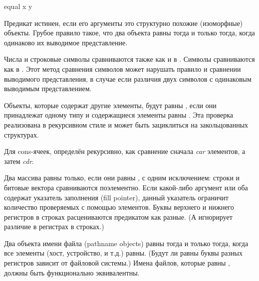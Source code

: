 \begin{defun}[Функция]
equal x y

Предикат  истинен, если его аргументы это структурно похожие
(изоморфные) объекты. Грубое правило такое, что два объекта равны 
тогда и только тогда, когда одинаково их выводимое представление.

Числа и строковые символы сравниваются также как и в .
Символы сравниваются как в . Этот метод сравнения символов может
нарушать правило и сравнении выводимого представления, в случае если различия
двух символов с одинаковым выводимым представлением.

Объекты, которые содержат другие элементы, будут равны , если они
принадлежат одному типу и содержащиеся элементы равны .
Эта проверка реализована в рекурсивном стиле и может быть зациклиться на
закольцованных структурах.

Для cons-ячеек,  определён рекурсивно, как сравнение 
сначала \emph{car} элементов, а затем \emph{cdr}.

Два массива равны  только, если они равны , с одним
исключением:
строки и битовые вектора сравниваются поэлементно.
Если какой-либо аргумент или оба содержат указатель заполнения (fill pointer),
данный указатель ограничит количество проверяемых с помощью 
элементов.
Буквы верхнего и нижнего регистров в строках расцениваются предикатом 
как разные. (А  игнорирует различие в регистрах в строках.) 

Два объекта имени файла (pathname objects) равны  тогда и только
тогда, когда все элементы (хост, устройство, и т.д.) равны. (Будут ли равны
буквы разных регистров зависит от файловой системы.) Имена файлов, которые равны
, должны быть функционально эквивалентны.


\end{defun}

